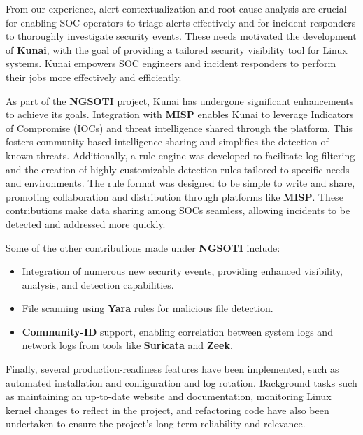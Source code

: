 From our experience, alert contextualization and root cause analysis are
crucial for enabling SOC operators to triage alerts effectively and for
incident responders to thoroughly investigate security events. These needs
motivated the development of \textbf{Kunai}, with the goal of providing a
tailored security visibility tool for Linux systems. Kunai empowers SOC
engineers and incident responders to perform their jobs more effectively and
efficiently.

As part of the \textbf{NGSOTI} project, Kunai has undergone significant
enhancements to achieve its goals. Integration with
\textbf{MISP}\cite{misp_project}
enables Kunai to leverage Indicators of Compromise (IOCs) and threat intelligence
shared through the platform. This fosters community-based intelligence sharing
and simplifies the detection of known threats. Additionally, a rule engine was
developed to facilitate log filtering and the creation of highly customizable
detection rules tailored to specific needs and environments. The rule format was
designed to be simple to write and share, promoting collaboration and distribution
through platforms like \textbf{MISP}. These contributions make data sharing
among SOCs seamless, allowing incidents to be detected and addressed more quickly.

Some of the other contributions made under \textbf{NGSOTI} include:
\begin{itemize}
	\item Integration of numerous new security events, providing enhanced
visibility, analysis, and detection capabilities.
	\item File scanning using
\textbf{Yara}\cite{yara_x} rules for malicious file detection.
	\item \textbf{Community-ID}\cite{community_id_spec}
support, enabling correlation between system logs and network logs from tools
like \textbf{Suricata}\cite{suricata_website}
and \textbf{Zeek}\cite{zeek_website}.
\end{itemize}

Finally, several production-readiness features have been implemented, such as
automated installation and configuration and log rotation. Background tasks
such as maintaining an up-to-date website and documentation\cite{kunai_why},
monitoring Linux kernel changes to reflect in the project, and refactoring
code have also been undertaken to ensure the project's long-term reliability
and relevance.

